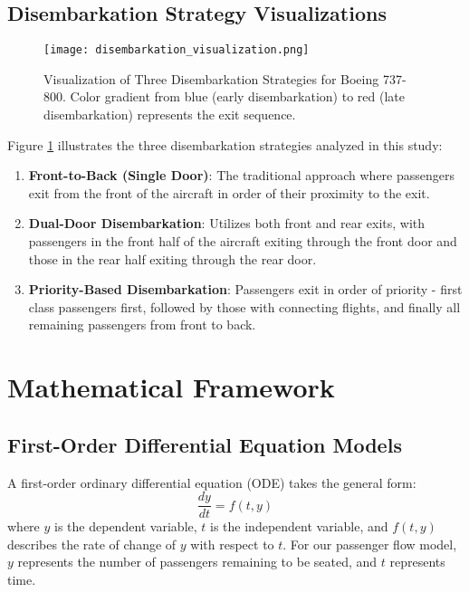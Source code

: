 \documentclass[12pt,a4paper]{article}
\begin{document}
\subsection{Disembarkation Strategy Visualizations}

\begin{figure}[H]
\centering
\texttt{[image: disembarkation\_visualization.png]}
\caption{Visualization of Three Disembarkation Strategies for Boeing 737-800. Color gradient from blue (early disembarkation) to red (late disembarkation) represents the exit sequence.}
\label{fig:disembarkation_strategies}
\end{figure}

Figure \ref{fig:disembarkation_strategies} illustrates the three disembarkation strategies analyzed in this study:

\begin{enumerate}
    \item \textbf{Front-to-Back (Single Door)}: The traditional approach where passengers exit from the front of the aircraft in order of their proximity to the exit.
    
    \item \textbf{Dual-Door Disembarkation}: Utilizes both front and rear exits, with passengers in the front half of the aircraft exiting through the front door and those in the rear half exiting through the rear door.
    
    \item \textbf{Priority-Based Disembarkation}: Passengers exit in order of priority - first class passengers first, followed by those with connecting flights, and finally all remaining passengers from front to back.
\end{enumerate}

\section{Mathematical Framework}

\subsection{First-Order Differential Equation Models}
A first-order ordinary differential equation (ODE) takes the general form:
\begin{equation}
\frac{dy}{dt} = f(t, y)
\label{eq:first_order_ode}
\end{equation}
where $y$ is the dependent variable, $t$ is the independent variable, and $f(t, y)$ describes the rate of change of $y$ with respect to $t$. For our passenger flow model, $y$ represents the number of passengers remaining to be seated, and $t$ represents time.
\end{document}
